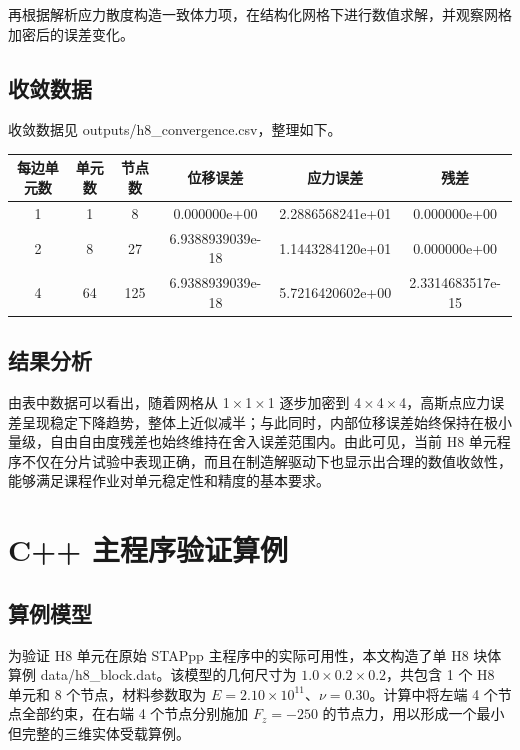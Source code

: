 \documentclass[12pt,a4paper]{article}
\begin{document}
再根据解析应力散度构造一致体力项，在结构化网格下进行数值求解，并观察网格加密后的误差变化。

\subsection{收敛数据}

收敛数据见 outputs/h8\_convergence.csv，整理如下。

\begin{center}
\small
\begin{tabular}{cccccc}
\toprule
每边单元数 & 单元数 & 节点数 & 位移误差 & 应力误差 & 残差 \\
\midrule
1 & 1 & 8 & 0.000000e+00 & 2.2886568241e+01 & 0.000000e+00 \\
2 & 8 & 27 & 6.9388939039e-18 & 1.1443284120e+01 & 0.000000e+00 \\
4 & 64 & 125 & 6.9388939039e-18 & 5.7216420602e+00 & 2.3314683517e-15 \\
\bottomrule
\end{tabular}
\normalsize
\end{center}

\subsection{结果分析}

由表中数据可以看出，随着网格从 1\,$\times$\,1\,$\times$\,1 逐步加密到 4\,$\times$\,4\,$\times$\,4，高斯点应力误差呈现稳定下降趋势，整体上近似减半；与此同时，内部位移误差始终保持在极小量级，自由自由度残差也始终维持在舍入误差范围内。由此可见，当前 H8 单元程序不仅在分片试验中表现正确，而且在制造解驱动下也显示出合理的数值收敛性，能够满足课程作业对单元稳定性和精度的基本要求。

\section{C++ 主程序验证算例}

\subsection{算例模型}

为验证 H8 单元在原始 STAPpp 主程序中的实际可用性，本文构造了单 H8 块体算例 data/h8\_block.dat。该模型的几何尺寸为 $1.0 \times 0.2 \times 0.2$，共包含 1 个 H8 单元和 8 个节点，材料参数取为 $E = 2.10\times 10^{11}$、$\nu = 0.30$。计算中将左端 4 个节点全部约束，在右端 4 个节点分别施加 $F_z=-250$ 的节点力，用以形成一个最小但完整的三维实体受载算例。
\end{document}
